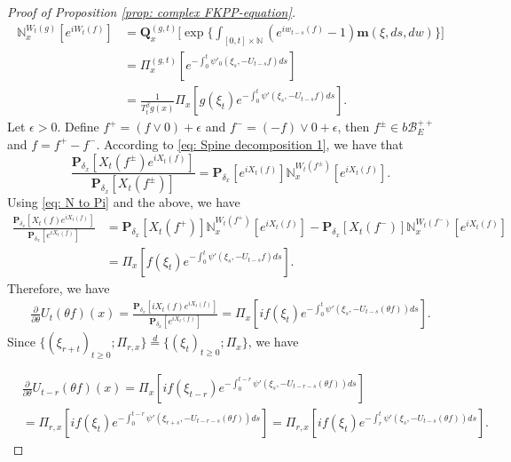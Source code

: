 \documentclass[12pt]{amsart}
\theoremstyle{plain}
\theoremstyle{definition}
\numberwithin{equation}{section}
\begin{document}
\begin{proof}[Proof of Proposition \ref{prop: complex FKPP-equation}]
\begin{align}
\label{eq: N to Pi}
    \mathbb N_x^{W_t(g)}[e^{i W_t(f)}]
    &=\mathbf Q_x^{(g,t)} \Big[\exp\Big\{\int_{[0,t]\times \mathbb N}(e^{i w_{t-s}(f)} - 1) \mathbf m(\xi, ds,dw)\Big\}\Big]
    \\&= \Pi_x^{(g,t)} [e^{-\int_0^t \psi'_0(\xi_s, -U_{t-s}f)ds}]
    \\&= \frac{1}{T_t^\beta g (x)} \Pi_x[ g(\xi_t) e^{-\int_0^t \psi'(\xi_s, -U_{t-s}f)ds} ].
\end{align}
    Let $\epsilon >0$.
    Define $f^+ = (f \vee 0) + \epsilon$ and $f^- = (-f) \vee 0 + \epsilon$, then $f^\pm \in b\mathscr B^{++}_E$ and $f = f^+ - f^-$.
    According to \eqref{eq: Spine decomposition 1}, we have that
\begin{equation}
    \frac{\mathbf P_{\delta_x}[X_t(f^{\pm})e^{i X_t(f)}]}{\mathbf P_{\delta_x}[X_t(f^{\pm})]}
    = \mathbf P_{\delta_x}[e^{i X_t(f)}] \mathbb N_x^{W_t(f^{\pm})}[e^{i X_t(f)}].
\end{equation}
    Using \eqref{eq: N to Pi} and the above, we have
\begin{align}
    \frac{\mathbf P_{\delta_x}[X_t(f)e^{i X_t(f)}] }{\mathbf P_{\delta_x}[e^{i X_t(f)}]}
    &= \mathbf P_{\delta_x}[X_t(f^+)] \mathbb N_x^{W_t(f^+)} [e^{i X_t(f)}] - \mathbf P_{\delta_x}[X_t(f^-)]\mathbb N_x^{W_t(f^-)}[e^{i X_t(f)}]
    \\& = \Pi_x[ f(\xi_t) e^{- \int_0^t \psi'(\xi_s, -U_{t-s}f) ds}  ].
\end{align}
    Therefore, we have
\begin{align}
    \frac{\partial}{\partial \theta} {U_t(\theta f)(x)}
    = \frac{\mathbf P_{\delta_x}[iX_t(f)e^{i X_t(f)}] }{\mathbf P_{\delta_x}[e^{i X_t(f)}]}
    =  \Pi_x[ if(\xi_t) e^{ - \int_0^t \psi'(\xi_s, -U_{t-s}(\theta f)) ds} ].
\end{align}
    Since $\{(\xi_{r+t})_{t \geq 0}; \Pi_{r,x}\} \overset{d}{=} \{(\xi_{t})_{t\geq 0}; \Pi_{x}\} $, we have

\begin{align}
    &\frac{\partial}{\partial \theta} U_{t-r}(\theta f)( x)
    = \Pi_x[ i f(\xi_{t-r}) e^{-\int_0^{t-r} \psi'(\xi_s, -U_{t-r-s}(\theta f)) ds} ]
    \\&= \Pi_{r,x}[i f(\xi_t)e^{-\int_0^{t-r} \psi'(\xi_{r+s}, -U_{t-r-s}(\theta f)) ds} ]
    = \Pi_{r,x}[if(\xi_t)e^{-\int_r^t \psi'(\xi_{s}, -U_{t-s}(\theta f)) ds} ].
\end{align}


\end{proof}
\end{document}
